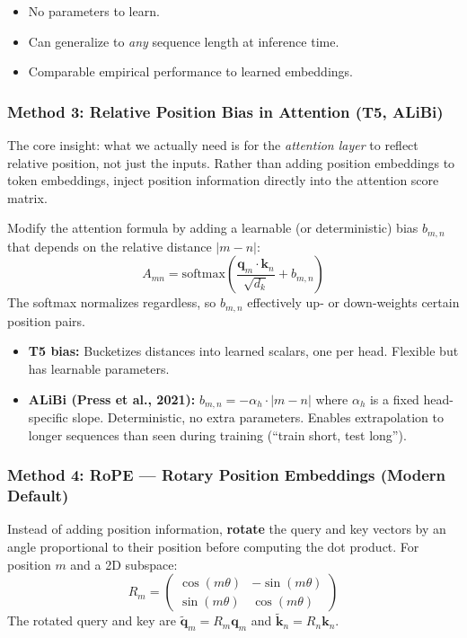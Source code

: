 \documentclass[11pt, a4paper]{article}
\begin{document}
\begin{notebox}
\begin{itemize}[leftmargin=1.5em]
  \item No parameters to learn.
  \item Can generalize to \emph{any} sequence length at inference time.
  \item Comparable empirical performance to learned embeddings.
\end{itemize}
\end{notebox}

\subsubsection{Method 3: Relative Position Bias in Attention (T5, ALiBi)}

The core insight: what we actually need is for the \emph{attention layer} to reflect relative position, not just the inputs. Rather than adding position embeddings to token embeddings, inject position information directly into the attention score matrix.

\begin{defbox}
Modify the attention formula by adding a learnable (or deterministic) bias $b_{m,n}$ that depends on the relative distance $|m - n|$:
\[
A_{mn} = \text{softmax}\!\left(\frac{\mathbf{q}_m \cdot \mathbf{k}_n}{\sqrt{d_k}} + b_{m,n}\right)
\]
The softmax normalizes regardless, so $b_{m,n}$ effectively up- or down-weights certain position pairs.
\end{defbox}

\begin{itemize}[leftmargin=2em]
  \item \textbf{T5 bias:} Bucketizes distances into learned scalars, one per head. Flexible but has learnable parameters.
  \item \textbf{ALiBi (Press et al., 2021):} $b_{m,n} = -\alpha_h \cdot |m - n|$ where $\alpha_h$ is a fixed head-specific slope. Deterministic, no extra parameters. Enables extrapolation to longer sequences than seen during training (``train short, test long'').
\end{itemize}

\subsubsection{Method 4: RoPE --- Rotary Position Embeddings (Modern Default)}

\begin{defbox}
Instead of adding position information, \textbf{rotate} the query and key vectors by an angle proportional to their position before computing the dot product. For position $m$ and a 2D subspace:
\[
R_m = \begin{pmatrix} \cos(m\theta) & -\sin(m\theta) \\ \sin(m\theta) & \cos(m\theta) \end{pmatrix}
\]
The rotated query and key are $\tilde{\mathbf{q}}_m = R_m \mathbf{q}_m$ and $\tilde{\mathbf{k}}_n = R_n \mathbf{k}_n$.
\end{defbox}
\end{document}
